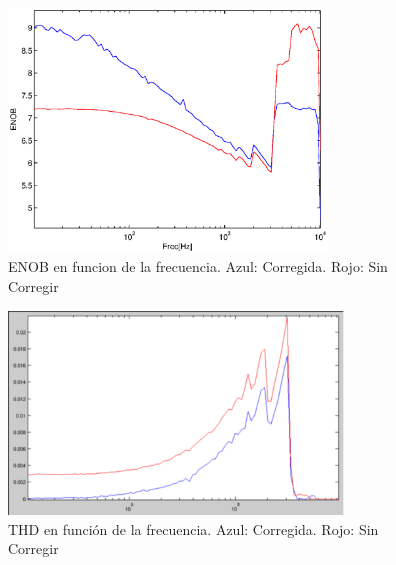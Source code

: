 \documentclass[a4paper,conference]{IEEEtran}
\begin{document}
\begin{figure}[!t]
\centering
\includegraphics[width=3.33in]{Medicion_ENOB}
\caption{ENOB en funcion de la frecuencia. Azul: Corregida. Rojo: Sin Corregir}
\label{fig:ENOB}
\end{figure}

\begin{figure}[!t]
\centering
\includegraphics[width=3.5in]{Medicion_THD}
\caption{THD en función de la frecuencia. Azul: Corregida. Rojo: Sin Corregir}
\label{fig:THD}
\end{figure}
\end{document}
